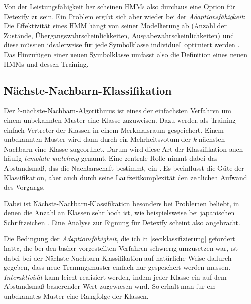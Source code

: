 Von der Leistungsfähigkeit her scheinen HMMs also durchaus eine Option für Detexify zu sein. Ein Problem ergibt sich aber wieder bei der \emph{Adaptionsfähigkeit}: Die Effektivität eines HMM hängt von seiner Modellierung ab (Anzahl der Zustände, Übergangswahrscheinlichkeiten, Ausgabewahrscheinlichkeiten) und diese müssten idealerweise für jede Symbolklasse individuell optimiert werden \cite{Fitzgerald:2005p331}. Das Hinzufügen einer neuen Symbolklasse umfasst also die Definition eines neuen HMMs und dessen Training.

\subsection{Nächste-Nachbarn-Klassifikation} \label{sub:knn}

Der $k$-nächste-Nachbarn-Algorithmus \cite[S.18]{eva:pattern} ist eines der einfachsten Verfahren um einem unbekannten Muster eine Klasse zuzuweisen. Dazu werden als Training einfach Vertreter der Klassen in einem Merkmalsraum gespeichert. Einem unbekannten Muster wird dann durch ein Mehrheitsvotum der $k$ nächsten Nachbarn eine Klasse zugeordnet. Darum wird diese Art der Klassifikation auch häufig \emph{template matching} genannt. Eine zentrale Rolle nimmt dabei das Abstandsmaß, das die Nachbarschaft bestimmt, ein \cite{Jaeger:2003p1097}. Es beeinflusst die Güte der Klassifikation, aber auch durch seine Laufzeitkomplexität den zeitlichen Aufwand des Vorgangs.

Dabei ist Nächste-Nachbarn-Klassifikation besonders bei Problemen beliebt, in denen die Anzahl an Klassen sehr hoch ist, wie beispielsweise bei japanischen Schriftzeichen \cite{Jaeger:2003p1097}. Eine Analyse zur Eignung für Detexify scheint also angebracht.

Die Bedingung der \emph{Adaptionsfähigkeit}, die ich in \ref{sec:klassifizierung} gefordert hatte, die bei den bisher vorgestellten Verfahren schwierig umzusetzen war, ist dabei bei der Nächste-Nachbarn-Klassifikation auf natürliche Weise dadurch gegeben, dass neue Trainingsmuster einfach nur gespeichert werden müssen. \emph{Interaktivität} kann leicht realisiert werden, indem jeder Klasse ein auf dem Abstandsmaß basierender Wert zugewiesen wird. So erhält man für ein unbekanntes Muster eine Rangfolge der Klassen.

